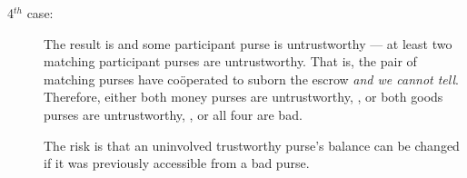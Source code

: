\begin{description}
\item [4$^{th}$ case:]  The result is   and some participant
  purse is untrustworthy ---  at least two
  matching participant purses are untrustworthy. 
  That is, the pair of matching purses  
%  
 have co{\"o}perated to
  suborn the escrow \textit{and we cannot tell}.   
 Therefore, either both money purses are untrustworthy, 
 ,  %
or both goods purses are untrustworthy, 
 ,
%
%
%
%
%
%
%
or all four are bad. %

The risk is that an uninvolved trustworthy purse's balance can be
changed if it was previously accessible from a bad purse.

\end{description}

